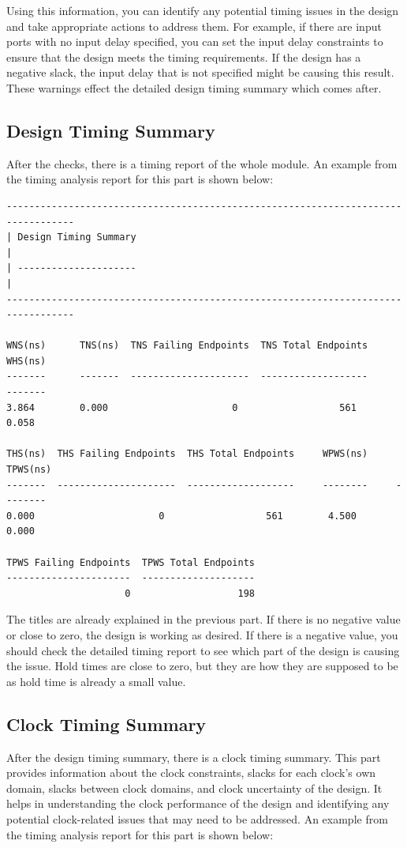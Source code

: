\documentclass{report}
\begin{document}
Using this information, you can identify any potential timing issues in the design and take appropriate actions to address them. For example, if there are input ports with no input delay specified, you can set the input delay constraints to ensure that the design meets the timing requirements.
If the design has a negative slack, the input delay that is not specified might be causing this result.
These warnings effect the detailed design timing summary which comes after.

\subsection{Design Timing Summary}
After the checks, there is a timing report of the whole module.
An example from the timing analysis report for this part is shown below:

\begin{verbatim}
----------------------------------------------------------------------------------
| Design Timing Summary                                                          |
| ---------------------                                                          |
----------------------------------------------------------------------------------

WNS(ns)      TNS(ns)  TNS Failing Endpoints  TNS Total Endpoints      WHS(ns)      
-------      -------  ---------------------  -------------------      -------
3.864        0.000                      0                  561        0.058

THS(ns)  THS Failing Endpoints  THS Total Endpoints     WPWS(ns)     TPWS(ns)  
-------  ---------------------  -------------------     --------     -------- 
0.000                      0                  561        4.500        0.000   

TPWS Failing Endpoints  TPWS Total Endpoints  
----------------------  --------------------
                     0                   198    
\end{verbatim}

The titles are already explained in the previous part. If there is no negative value or close to zero, the design is working as desired. If there is a negative value, you should check the detailed timing report to see which part of the design is causing the issue.
Hold times are close to zero, but they are how they are supposed to be as hold time is already a small value.

\subsection{Clock Timing Summary}
After the design timing summary, there is a clock timing summary. This part provides information about the clock constraints, slacks for each clock's own domain, slacks between clock domains, and clock uncertainty of the design. It helps in understanding the clock performance of the design and identifying any potential clock-related issues that may need to be addressed.
An example from the timing analysis report for this part is shown below:
\end{document}
